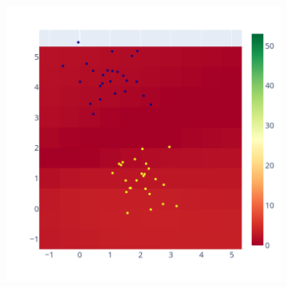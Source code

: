 \documentclass[11pt]{article}
\begin{document}

\begin{figure}
    \centering
    \begin{subfigure}{.3\linewidth}
    \includegraphics[width=\linewidth]{figure/separating_hyperplan/hyperplan.png}
    \caption{}
    \label{fig:hyperplan_sig}
    \end{subfigure}
    \begin{subfigure}{.3\linewidth}

\end{subfigure}
\end{figure}
\end{document}
